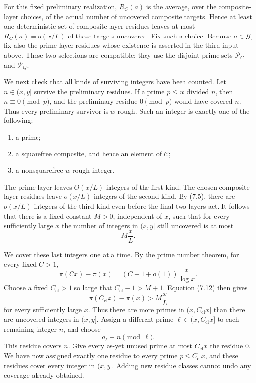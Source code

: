 \documentclass[10pt,letterpaper]{article}
\newcommand{\PC}{\mathcal{P}_C}
\newcommand{\PQ}{\mathcal{P}_Q}
\begin{document}
For this fixed preliminary realization, $R_C(a)$ is the average, over the composite-layer choices, of the actual
number of uncovered composite targets. Hence at least one deterministic set of composite-layer residues leaves
at most $R_C(a)=o(x/L)$ of those targets uncovered. Fix such a choice. Because $a\in\mathcal{G}$, fix also the prime-layer
residues whose existence is asserted in the third input above. These two selections are compatible: they use the
disjoint prime sets $\PC$ and $\PQ$.

We next check that all kinds of surviving integers have been counted. Let $n\in(x,y]$ survive the preliminary
residues. If a prime $p\le w$ divided $n$, then $n\equiv0\pmod p$, and the preliminary residue $0\pmod p$ would have
covered $n$. Thus every preliminary survivor is $w$-rough. Such an integer is exactly one of the following:
\begin{enumerate}
\item a prime;
\item a squarefree composite, and hence an element of $\mathcal{C}$;
\item a nonsquarefree $w$-rough integer.
\end{enumerate}
The prime layer leaves $O(x/L)$ integers of the first kind. The chosen composite-layer residues leave $o(x/L)$
integers of the second kind. By (7.5), there are $o(x/L)$ integers of the third kind even before the final two layers
act. It follows that there is a fixed constant $M>0$, independent of $x$, such that for every sufficiently large $x$
the number of integers in $(x,y]$ still uncovered is at most
\begin{equation}
M\frac xL.
\tag{7.11}
\end{equation}

We cover these last integers one at a time. By the prime number theorem, for every fixed $C>1$,
\begin{equation}
\pi(Cx)-\pi(x)=(C-1+o(1))\frac{x}{\log x}.
\tag{7.12}
\end{equation}
Choose a fixed $C_{\mathrm{cl}}>1$ so large that $C_{\mathrm{cl}}-1>M+1$. Equation (7.12) then gives
\begin{equation}
\pi(C_{\mathrm{cl}}x)-\pi(x)>M\frac xL
\tag{7.13}
\end{equation}
for every sufficiently large $x$. Thus there are more primes in $(x,C_{\mathrm{cl}}x]$ than there are uncovered integers in
$(x,y]$. Assign a different prime $\ell\in(x,C_{\mathrm{cl}}x]$ to each remaining integer $n$, and choose
\begin{equation}
a_\ell\equiv n\pmod\ell.
\tag{7.14}
\end{equation}
This residue covers $n$. Give every as-yet unused prime at most $C_{\mathrm{cl}}x$ the residue $0$. We have now assigned
exactly one residue to every prime $p\le C_{\mathrm{cl}}x$, and these residues cover every integer in $(x,y]$. Adding new residue
classes cannot undo any coverage already obtained.
\end{document}
